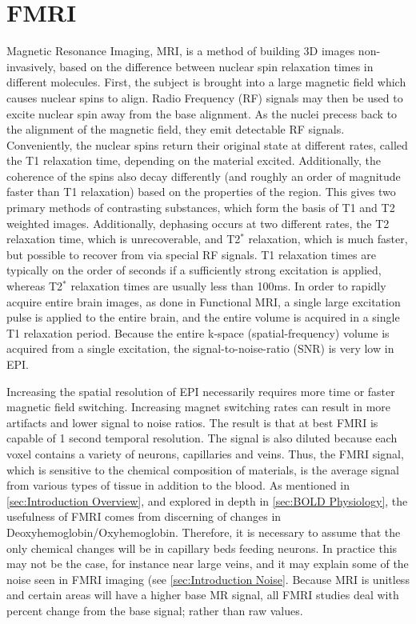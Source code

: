 \section{FMRI}
Magnetic Resonance Imaging, MRI, is a method of building 3D images
non-invasively, based on the difference between nuclear spin
relaxation times in different molecules. First, the subject 
is brought into a large magnetic field which causes nuclear spins
to align. Radio Frequency (RF) signals may
then be used to excite nuclear spin away from the base alignment. 
As the nuclei precess back to the alignment of the magnetic
field, they emit detectable RF signals. Conveniently, the
nuclear spins return their original state at different
rates, called the T1 relaxation time, depending on the material excited.
Additionally, the
coherence of the spins also decay differently (and roughly an order of 
magnitude faster
than T1 relaxation) based on the properties of the region.
This gives two primary methods of contrasting substances,
which form the basis of T1 and T2 weighted images. Additionally, 
dephasing occurs at two different rates, the T2 relaxation time,
which is unrecoverable, and T2$^*$ relaxation, which is
much faster, but possible to recover from via special RF signals.
T1 relaxation times are typically on the order of seconds if 
a sufficiently strong excitation is applied, whereas T2$^*$ relaxation
times are usually less than 100ms. 
In order to rapidly acquire entire brain images, as done in Functional 
MRI, a single large excitation pulse is applied to the entire brain,
and the entire volume is acquired in a single T1 relaxation period. 
Because the entire k-space (spatial-frequency) volume is acquired 
from a single excitation, the signal-to-noise-ratio (SNR) is very low
in EPI. 

Increasing the spatial resolution of EPI necessarily 
requires more time or faster magnetic field switching. Increasing
magnet switching rates can result in
more artifacts and lower signal to noise ratios. The result is
that at best FMRI is capable of 1 second temporal resolution. 
The signal is also diluted because each voxel contains
a variety of neurons, capillaries and veins. 
Thus, the FMRI signal, which is sensitive to the chemical composition of 
materials, is the average signal from various types of tissue
in addition to the blood. As mentioned in \autoref{sec:Introduction Overview},
and explored in depth in \autoref{sec:BOLD Physiology},
the usefulness of FMRI comes from discerning of changes in 
Deoxyhemoglobin/Oxyhemoglobin. Therefore, it is necessary to assume
that the only chemical changes will be in
capillary beds feeding neurons. In practice this may not be the case, for
instance near large veins, and it may explain some of the
noise seen in FMRI imaging (see \autoref{sec:Introduction Noise}. 
Because MRI is unitless and certain
areas will have a higher base MR signal, all FMRI studies deal with
percent change from the base signal; rather than raw values. 

